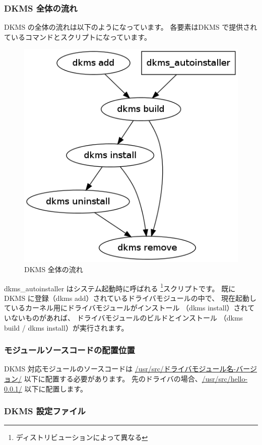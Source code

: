 \documentclass[mingoth,a4paper]{jsarticle}
\begin{document}
\subsubsection{DKMS 全体の流れ}

DKMS の全体の流れは以下のようになっています。
各要素はDKMS で提供されているコマンドとスクリプトになっています。

\begin{figure}[ht]
 \begin{center}
  \includegraphics[width=0.4\hsize]{image201202/dkms.png}
 \end{center}
\label{fig:dkms}\caption{DKMS 全体の流れ}
\end{figure}

dkms\_autoinstaller はシステム起動時に呼ばれる
\footnote{ディストリビューションによって異なる}スクリプトです。
既に DKMS に登録（dkms add）されているドライバモジュールの中で、
現在起動しているカーネル用にドライバモジュールがインストール
（dkms install）されていないものがあれば、
ドライバモジュールのビルドとインストール
（dkms build / dkms install）が実行されます。

\subsubsection{モジュールソースコードの配置位置}

DKMS 対応モジュールのソースコードは
\url{/usr/src/ドライバモジュール名-バージョン/} 以下に配置する必要があります。
先のドライバの場合、\url{/usr/src/hello-0.0.1/} 以下に配置します。

\subsubsection{DKMS 設定ファイル}
\end{document}
